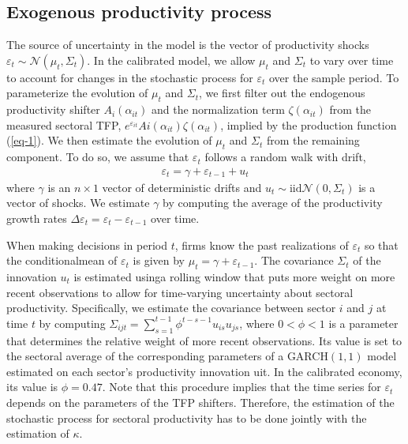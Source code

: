 \documentclass[11pt]{article}
\theoremstyle{definition}
\begin{document}
	\subsection*{Exogenous productivity process}
	The source of uncertainty in the model is the vector of productivity shocks $\varepsilon_t \sim \mathcal{N} (\mu_t, \Sigma_t)$. In the calibrated model, we allow $\mu_t$ and $\Sigma_t$ to vary over time to account for changes in the stochastic process for $\varepsilon_t$ over the sample period. To parameterize the evolution of $\mu_t$ and $\Sigma_t$, we first filter out the endogenous productivity shifter $A_i (\alpha_{it})$ and the normalization term $\zeta(\alpha_{it})$ from the measured sectoral TFP, $e^{\varepsilon_{it}}Ai(\alpha_{it})\zeta(\alpha_{it})$, implied by the production function (\ref{eq-1}). We then estimate the evolution of $\mu_t$ and $\Sigma_t$ from the remaining component. To do so, we assume that $\varepsilon_t$ follows a random walk with drift,
	\begin{align}
		\varepsilon_t = \gamma + \varepsilon_{t-1} + u_t \label{eq1-42} 
	\end{align}
	where $\gamma$ is an $n × 1$ vector of deterministic drifts and $u_t \sim \text{iid}\mathcal{N}(0, \Sigma_t)$ is a vector of shocks. We estimate $\gamma$ by computing the average of the productivity growth rates $\Delta\varepsilon_t = \varepsilon_t - \varepsilon_{t−1}$ over time.
	
	When making decisions in period $t$, firms know the past realizations of $\varepsilon_t$ so that the conditionalmean of $\varepsilon_t$ is given by $\mu_t = \gamma + \varepsilon_{t−1}$. The covariance $\Sigma_t$ of the innovation $u_t$ is estimated usinga rolling window that puts more weight on more recent observations to allow for time-varying uncertainty about sectoral productivity. Specifically, we estimate the covariance between sector $i$ and $j$ at time $t$ by computing $\Sigma_{ijt} = \sum\limits_{s=1}^{t-1}\phi^{t-s-1}u_{is}u_{js}$, where $0 < \phi < 1$ is a parameter that determines the relative weight of more recent observations. Its value is set to the sectoral average of the corresponding parameters of a GARCH$(1,1)$ model estimated on each sector’s productivity innovation uit. In the calibrated economy, its value is $\phi = 0.47$. Note that this procedure implies that the time series for $\varepsilon_t$ depends on the parameters of the TFP shifters. Therefore, the estimation of the stochastic process for sectoral productivity has to be done jointly with the estimation of $\kappa$.
	
\end{document}
